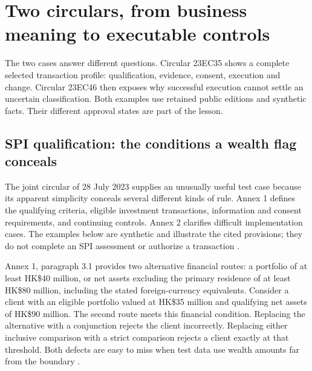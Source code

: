 \chapter{Two circulars, from business meaning to executable controls}
\label{ch:circular}


The two cases answer different questions. Circular 23EC35 shows a complete
selected transaction profile: qualification, evidence, consent, execution and
change. Circular 23EC46 then exposes why successful execution cannot settle an
uncertain classification. Both examples use retained public editions and
synthetic facts. Their different approval states are part of the lesson.

\section{SPI qualification: the conditions a wealth flag conceals}
\label{merge:P-01-problem:02}

\label{sec:spi}

The joint circular of 28 July 2023 supplies an unusually useful test case because
its apparent simplicity conceals several different kinds of rule. Annex 1
defines the qualifying criteria, eligible investment transactions, information
and consent requirements, and continuing controls. Annex 2 clarifies difficult
implementation cases. The examples below are synthetic and illustrate the cited
provisions; they do not complete an SPI assessment or authorize a transaction
\citep{sfcspi,sfcspiannex1,sfcspiannex2}.


Annex 1, paragraph 3.1 provides two alternative financial routes: a portfolio of
at least HK\$40 million, or net assets excluding the primary residence of at least
HK\$80 million, including the stated foreign-currency equivalents. Consider a
client with an eligible portfolio valued at HK\$35 million and qualifying net
assets of HK\$90 million. The second route meets this financial condition.
Replacing the alternative with a conjunction rejects the client incorrectly.
Replacing either inclusive comparison with a strict comparison rejects a client
exactly at that threshold. Both defects are easy to miss when test data use
wealth amounts far from the boundary \citep[Annex 1, para.~3.1]{sfcspiannex1}.

